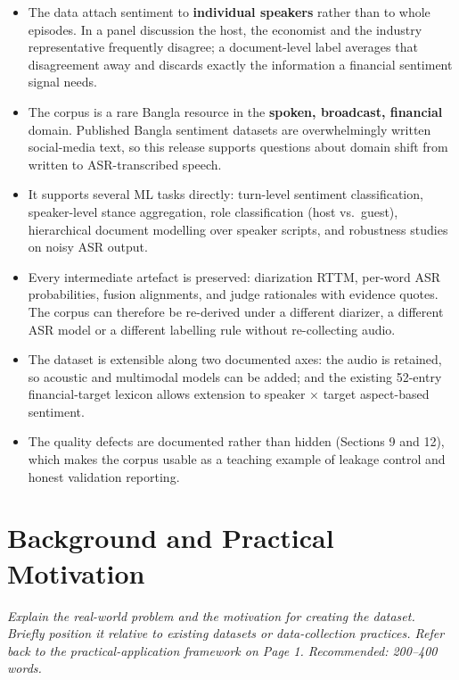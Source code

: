 \documentclass[11pt,a4paper]{article}
\begin{document}
\begin{itemize}[leftmargin=1.4em,itemsep=2pt,topsep=2pt]
  \item The data attach sentiment to \textbf{individual speakers} rather than to whole episodes.
        In a panel discussion the host, the economist and the industry representative frequently
        disagree; a document-level label averages that disagreement away and discards exactly the
        information a financial sentiment signal needs.
  \item The corpus is a rare Bangla resource in the \textbf{spoken, broadcast, financial} domain.
        Published Bangla sentiment datasets are overwhelmingly written social-media text, so this
        release supports questions about domain shift from written to ASR-transcribed speech.
  \item It supports several ML tasks directly: turn-level sentiment classification, speaker-level
        stance aggregation, role classification (host vs.\ guest), hierarchical document modelling
        over speaker scripts, and robustness studies on noisy ASR output.
  \item Every intermediate artefact is preserved: diarization RTTM, per-word ASR probabilities,
        fusion alignments, and judge rationales with evidence quotes. The corpus can therefore
        be re-derived under a different diarizer, a different ASR model or a different labelling
        rule without re-collecting audio.
  \item The dataset is extensible along two documented axes: the audio is retained, so acoustic
        and multimodal models can be added; and the existing 52-entry financial-target lexicon
        allows extension to speaker $\times$ target aspect-based sentiment.
  \item The quality defects are documented rather than hidden (Sections 9 and 12), which makes the
        corpus usable as a teaching example of leakage control and honest validation reporting.
\end{itemize}

\section{Background and Practical Motivation}

\emph{\small Explain the real-world problem and the motivation for creating the dataset. Briefly
position it relative to existing datasets or data-collection practices. Refer back to the
practical-application framework on Page 1. Recommended: 200--400 words.}
\end{document}
